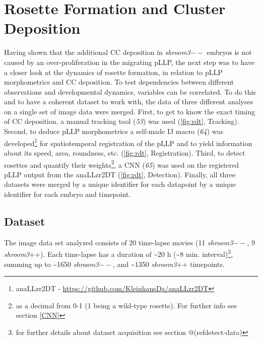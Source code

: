 \documentclass[11pt,singlespacinge,twoside]{reedthesis} %
\begin{document}
\hypertarget{rosette-formation-and-cluster-deposition}{%
\section{Rosette Formation and Cluster Deposition}\label{rosette-formation-and-cluster-deposition}}

Having shown that the additional CC deposition in \emph{shroom3}\(--\) embryos is not caused by an over-proliferation in the migrating pLLP, the next step was to have a closer look at the dynamics of rosette formation, in relation to pLLP morphometrics and CC deposition. To test dependencies between different observations and developmental dynamics, variables can be correlated. To do this and to have a coherent dataset to work with, the data of three different analyses on a single set of image data were merged.
First, to get to know the exact timing of CC deposition, a manual tracking tool (\emph{53}) was used (\ref{fig:rdt}, Tracking). Second, to deduce pLLP morphometrics a self-made IJ macro (\emph{64}) was developed\footnote{anaLLzr2DT - \url{https://github.com/KleinhansDa/anaLLzr2DT}} for spatiotemporal registration of the pLLP and to yield information about its speed, area, roundness, etc. (\ref{fig:rdt}, Registration). Third, to detect rosettes and quantify their weights\footnote{as a decimal from 0-1 (1 being a wild-type rosette). For further info see section \ref{CNN}}, a CNN (\emph{65}) was used on the registered pLLP output from the anaLLzr2DT (\ref{fig:rdt}, Detection). Finally, all three datasets were merged by a unique identifier for each datapoint by a unique identifier for each embryo and timepoint.

\hypertarget{dataset-2}{%
\subsection{Dataset}\label{dataset-2}}

The image data set analyzed consists of 20 time-lapse movies (11 \emph{shroom3}\(--\), 9 \emph{shroom3}++). Each time-lapse has a duration of \textasciitilde{}20 h (\textasciitilde{}8 min. interval)\footnote{for further details about dataset acquisition see section @(refdetect-data)}, summing up to \textasciitilde{}1650 \emph{shroom3}\(--\), and \textasciitilde{}1350 \emph{shroom3}++ timepoints.
\end{document}
